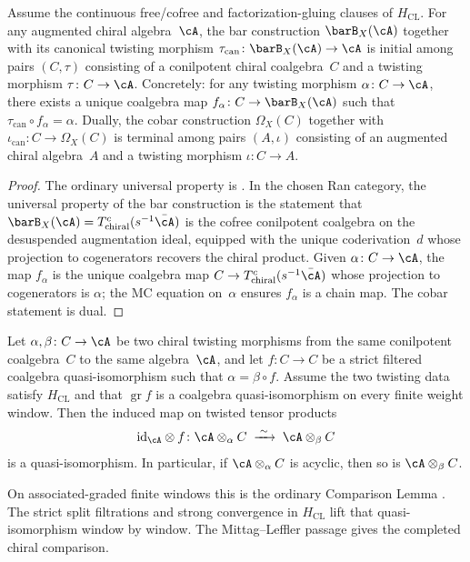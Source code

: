 \begin{proposition}
\label{prop:bar-universal-property}
Assume the continuous free/cofree and factorization-gluing clauses of
$H_{\mathrm{CL}}$.  For any augmented chiral algebra~$\cA$, the bar construction
$\barB_X(\cA)$ together with its canonical twisting morphism
$\tau_{\mathrm{can}} \colon \barB_X(\cA) \to \cA$
is initial among pairs $(C, \tau)$ consisting of a conilpotent chiral
coalgebra~$C$ and a twisting morphism $\tau \colon C \to \cA$.
Concretely: for any twisting morphism $\alpha \colon C \to \cA$,
there exists a unique coalgebra map
$f_\alpha \colon C \to \barB_X(\cA)$
such that $\tau_{\mathrm{can}} \circ f_\alpha = \alpha$.
Dually, the cobar construction $\Omega_X(C)$ together with
$\iota_{\mathrm{can}} \colon C \to \Omega_X(C)$ is terminal among
pairs $(A, \iota)$ consisting of an augmented chiral algebra~$A$
and a twisting morphism $\iota \colon C \to A$.
\end{proposition}

\begin{proof}
The ordinary universal property is
\cite[Theorem~2.2.9]{LodayVallette12}.  In the chosen Ran category,
the universal property of the bar construction is the statement
that $\barB_X(\cA) = T^c_{\mathrm{chiral}}(s^{-1}\bar{\cA})$
is the cofree conilpotent coalgebra on the desuspended
augmentation ideal, equipped with the unique coderivation~$d$
whose projection to cogenerators recovers the chiral product.
Given $\alpha \colon C \to \cA$, the map $f_\alpha$ is the
unique coalgebra map $C \to T^c_{\mathrm{chiral}}(s^{-1}\bar{\cA})$
whose projection to cogenerators is $\alpha$; the MC equation
on~$\alpha$ ensures $f_\alpha$ is a chain map. The cobar
statement is dual.
\end{proof}

\begin{theorem}
\label{thm:chiral-comparison-lemma}
Let $\alpha, \beta \colon C \to \cA$ be two chiral twisting morphisms
from the same conilpotent coalgebra~$C$ to the same algebra~$\cA$,
and let $f \colon C \to C$ be a strict filtered coalgebra
quasi-isomorphism such that $\alpha = \beta \circ f$.  Assume the two
twisting data satisfy $H_{\mathrm{CL}}$ and that
$\operatorname{gr}f$ is a coalgebra quasi-isomorphism on every finite
weight window. Then the induced map on twisted tensor
products
\[
\mathrm{id}_\cA \otimes f \colon
\cA \otimes_\alpha C \;\xrightarrow{\;\sim\;}\; \cA \otimes_\beta C
\]
is a quasi-isomorphism. In particular, if
$\cA \otimes_\alpha C$ is acyclic, then so is
$\cA \otimes_\beta C$.

On associated-graded finite windows this is the ordinary Comparison
Lemma \cite[Lemma~2.1.9]{LodayVallette12}.  The strict split
filtrations and strong convergence in $H_{\mathrm{CL}}$ lift that
quasi-isomorphism window by window.  The Mittag--Leffler passage gives
the completed chiral comparison.
\end{theorem}

